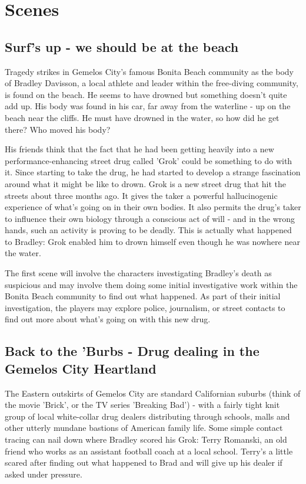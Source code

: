\documentclass[letterpaper,serif]{rpg-module}
\begin{document}
\section{Scenes}

\subsection{Surf's up - we should be at the beach}

Tragedy strikes in Gemelos City's famous Bonita Beach community as the body of Bradley Davisson, a local athlete and leader within the free-diving community, is found on the beach. He seems to have drowned but something doesn't quite add up. His body was found in his car, far away from the waterline - up on the beach near the cliffs. He must have drowned in the water, so how did he get there? Who moved his body?

His friends think that the fact that he had been getting heavily into a new performance-enhancing street drug called 'Grok' could be something to do with it. Since starting to take the drug, he had started to develop a strange fascination around what it might be like to drown. Grok is a new street drug that hit the streets about three months ago. It gives the taker a powerful hallucinogenic experience of what's going on in their own bodies. It also permits the drug's taker to influence their own biology through a conscious act of will - and in the wrong hands, such an activity is proving to be deadly. This is actually what happened to Bradley: Grok enabled him to drown himself even though he was nowhere near the water.  

The first scene will involve the characters investigating Bradley's death as suspicious and may involve them doing some initial investigative work within the Bonita Beach community to find out what happened. As part of their initial investigation, the players may explore police, journalism, or street contacts to find out more about what's going on with this new drug. 

\subsection{ Back to the 'Burbs - Drug dealing in the Gemelos City Heartland}

The Eastern outskirts of Gemelos City are standard Californian suburbs (think of the movie 'Brick', or the TV series 'Breaking Bad') - with a fairly tight knit group of local white-collar drug dealers distributing through schools, malls and other utterly mundane bastions of American family life. Some simple contact tracing can nail down where Bradley scored his Grok: Terry Romanski, an old friend who works as an assistant football coach at a local school. Terry's a little scared after finding out what happened to Brad and will give up his dealer if asked under pressure. 
\end{document}
